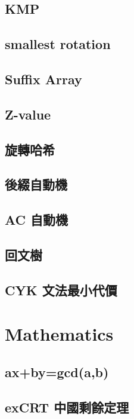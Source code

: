 \subsection{KMP}

\subsection{smallest rotation}

\subsection{Suffix Array}

\subsection{Z-value}

\subsection{旋轉哈希}

\subsection{後綴自動機}

\subsection{AC 自動機}

\subsection{回文樹}

\subsection{CYK 文法最小代價}


\section{Mathematics}

\subsection{ax+by=gcd(a,b)}

\subsection{exCRT 中國剩餘定理}

